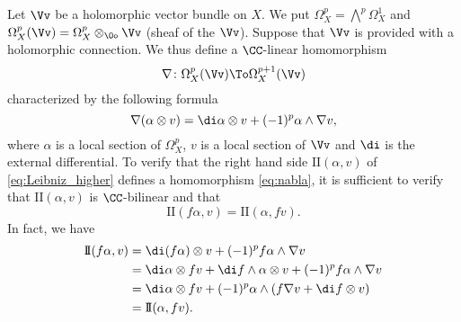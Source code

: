 \begin{para}\label{hypothesis:2.10}
  Let $\Vv$ be a holomorphic vector bundle on $X$.
  We put $\Omega_X^p=\bigwedge^p\Omega_X^1$ and
  $\Omega_X^p(\Vv)=\Omega_X^p\otimes_\Oo\Vv$
  (sheaf of the  $\Vv$).
  Suppose that $\Vv$ is provided with a holomorphic connection.
  We thus define a $\CC$-linear homomorphism
  \begin{equation}\label{eq:nabla}
    \nabla\colon\Omega_X^p(\Vv)\To\Omega_X^{p+1}(\Vv)
  \end{equation}
  characterized by the following formula
  \begin{equation}\label{eq:Leibniz_higher}
    \nabla(\alpha\otimes v) = \di\alpha\otimes v + (-1)^p\alpha\wedge\nabla v,
  \end{equation}
  where $\alpha$ is a local section of $\Omega_X^p$, $v$ is a local section of
  $\Vv$ and $\di$ is the external differential.
  To verify that the right hand side $\mathrm{I\!I}(\alpha, v)$ of
  \cref{eq:Leibniz_higher} defines a homomorphism \cref{eq:nabla},
  it is sufficient to verify that $\mathrm{I\!I}(\alpha, v)$ is
  $\CC$-bilinear and that
  \[
  \mathrm{I\!I}(f\alpha, v) = \mathrm{I\!I}(\alpha, fv).
  \]
  In fact, we have
  \begin{align*}
    \mathrm{I\!I}(f\alpha, v) &=
    \di(f\alpha)\otimes v + (-1)^pf\alpha\wedge\nabla v \\
    &= \di\alpha\otimes fv + \di f\wedge\alpha\otimes v
    + (-1)^pf\alpha\wedge\nabla v \\
    &= \di\alpha\otimes fv + (-1)^p\alpha\wedge(f\nabla v + \di f\otimes v) \\
    &= \mathrm{I\!I}(\alpha, fv).
  \end{align*}


\end{para}
